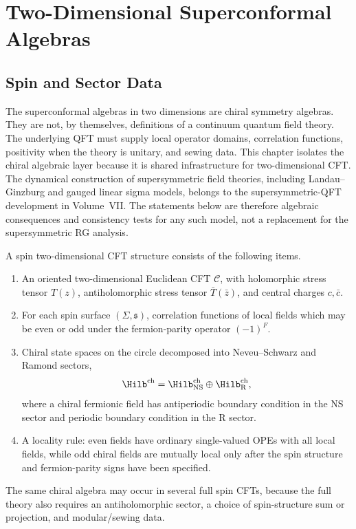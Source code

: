 \chapter{Two-Dimensional Superconformal Algebras}
\label{ch:two-dimensional-superconformal-algebras}

\ConventionsEuclideanCFT

\section{Spin and Sector Data}

The superconformal algebras in two dimensions are chiral symmetry algebras.
They are not, by themselves, definitions of a continuum quantum field theory.
The underlying QFT must supply local operator domains, correlation functions,
positivity when the theory is unitary, and sewing data.  This chapter isolates
the chiral algebraic layer because it is shared infrastructure for
two-dimensional CFT.  The dynamical construction of supersymmetric field
theories, including Landau--Ginzburg and gauged linear sigma models, belongs
to the supersymmetric-QFT development in Volume~VII.  The statements below are
therefore algebraic consequences and consistency tests for any such model,
not a replacement for the supersymmetric RG analysis.

\begin{definition}
\label{def:spin-two-dimensional-cft-structure}
A spin two-dimensional CFT structure consists of the following items.
\begin{enumerate}
\item An oriented two-dimensional Euclidean CFT \(\mathcal C\), with
holomorphic stress tensor \(T(z)\), antiholomorphic stress tensor
\(\bar T(\bar z)\), and central charges \(c,\bar c\).
\item For each spin surface \((\Sigma,\mathfrak s)\), correlation functions
of local fields which may be even or odd under the fermion-parity operator
\((-1)^F\).
\item Chiral state spaces on the circle decomposed into Neveu--Schwarz and
Ramond sectors,
\[
  \Hilb^{\mathrm{ch}}
  =
  \Hilb_{\mathrm{NS}}^{\mathrm{ch}}
  \oplus
  \Hilb_{\mathrm R}^{\mathrm{ch}},
\]
where a chiral fermionic field has antiperiodic boundary condition in the
NS sector and periodic boundary condition in the R sector.
\item A locality rule: even fields have ordinary single-valued OPEs with all
local fields, while odd chiral fields are mutually local only after the spin
structure and fermion-parity signs have been specified.
\end{enumerate}
The same chiral algebra may occur in several full spin CFTs, because the full
theory also requires an antiholomorphic sector, a choice of spin-structure
sum or projection, and modular/sewing data.
\end{definition}

